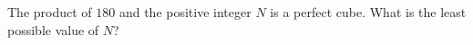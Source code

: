 The product of $180$ and the positive integer $N$ is a perfect cube. What is the least possible value of $N$?
